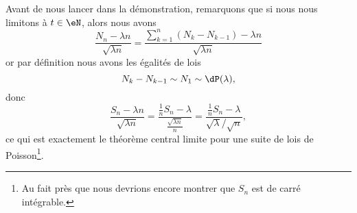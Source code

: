 \begin{remark}
    Avant de nous lancer dans la démonstration, remarquons que si nous nous limitons à \( t\in \eN\), alors nous avons
    \begin{equation}
        \frac{ N_n-\lambda n }{ \sqrt{\lambda n} }=\frac{ \sum_{k=1}^n(N_k-N_{k-1})-\lambda n }{ \sqrt{\lambda n} }
    \end{equation}
    or par définition nous avons les égalités de lois
    \begin{equation}
        N_k-N_{k-1}\sim N_1\sim \dP(\lambda),
    \end{equation}
    donc
    \begin{equation}
        \frac{ S_n-\lambda n }{ \sqrt{\lambda n} }=\frac{ \frac{1}{ n }S_n-\lambda }{ \frac{ \sqrt{\lambda n} }{ n } }=\frac{ \frac{1}{ n }S_n-\lambda }{ \sqrt{\lambda}/\sqrt{n} },
    \end{equation}
    ce qui est exactement le théorème central limite pour une suite de lois de Poisson\footnote{Au fait près que nous devrions encore montrer que \( S_n\) est de carré intégrable.}.
\end{remark}

